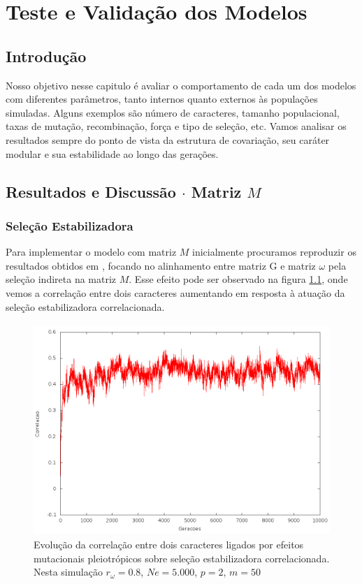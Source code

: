 \pagestyle{empty}
\cleardoublepage
\pagestyle{fancy}
\chapter{Teste e Validação dos Modelos}\label{cap3}

\section{Introdução}

Nosso objetivo nesse capitulo é avaliar o comportamento de cada um dos
modelos com diferentes parâmetros, tanto internos quanto
externos às populações simuladas.
Alguns exemplos são número de caracteres, tamanho populacional, taxas de
mutação, recombinação, força e tipo de seleção, etc. 
Vamos analisar os resultados sempre do ponto de vista da estrutura de
covariação, seu caráter modular e sua estabilidade ao longo das
gerações.


\section{Resultados e Discussão $\cdot$ Matriz $M$}\label{cap3:ModelM}

\subsection{Seleção Estabilizadora}

Para implementar o modelo com matriz $M$ inicialmente procuramos
reproduzir os resultados obtidos em \cite{Jones2007}, focando no
alinhamento entre matriz G e matriz $\omega$ pela seleção indireta na
matriz $M$. 
Esse efeito pode ser observado na figura \ref{jones2tracos}, onde vemos
a correlação entre dois caracteres aumentando em resposta à atuação da
seleção estabilizadora correlacionada.  

\begin{figure}[htbp]
  \centering
  \includegraphics[width=150mm, height=80mm]{figuras/jones2tracos.png}
  \caption{Evolução da correlação entre dois caracteres ligados por efeitos
  mutacionais pleiotrópicos sobre seleção estabilizadora correlacionada.
  Nesta simulação $r_\omega=0.8$, $Ne=5.000$, $p=2$, $m=50$}
  \label{jones2tracos}
\end{figure}


